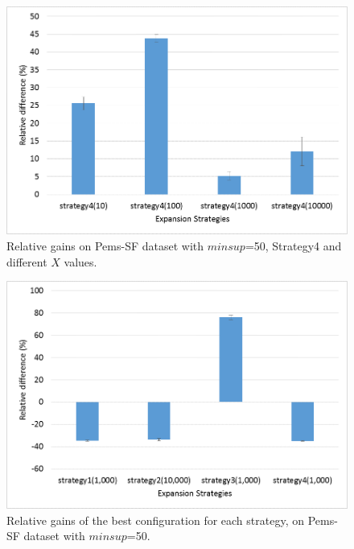 \begin{figure}[!t]
\includegraphics[width=5in]{immagini_extension/pems_strategy4.png}
\caption{Relative gains on Pems-SF dataset with $minsup$=50, Strategy4 and different $X$ values.
}
\label{pems_strategy4}
\end{figure}

\begin{figure}[!t]
\includegraphics[width=5in]{immagini_extension/pems_strategy_best.png}
\caption{Relative gains of the best configuration for each strategy, on Pems-SF dataset with $minsup$=50.
}
\label{pems_strategy_best}
\end{figure}


